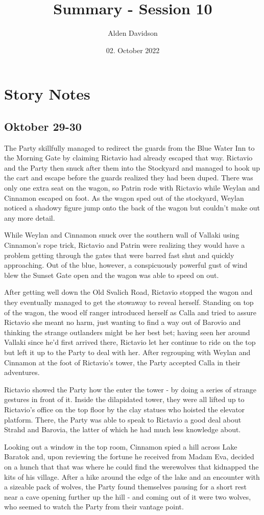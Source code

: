 \documentclass[a4paper,11pt]{article}
\title{Summary - Session 10}
\author{Alden Davidson}
\date{02. October 2022}
\begin{document}
\maketitle

\section{Story Notes}
\subsection{Oktober 29-30}
The Party skillfully managed to redirect the guards from the Blue Water Inn to the Morning Gate by claiming Rictavio
had already escaped that way. Rictavio and the Party then snuck after them into the Stockyard and managed to hook up
the cart and escape before the guards realized they had been duped. There was only one extra seat on the wagon, so
Patrin rode with Rictavio while Weylan and Cinnamon escaped on foot. As the wagon sped out of the stockyard, Weylan 
noticed a shadowy figure jump onto the back of the wagon but couldn't make out any more detail.

While Weylan and Cinnamon snuck over the southern wall of Vallaki using Cinnamon's rope trick, Rictavio and Patrin
were realizing they would have a problem getting through the gates that were barred fast shut and quickly 
approaching. Out of the blue, however, a conspicuously powerful gust of wind blew the Sunset Gate open and the wagon
was able to speed on out.

After getting well down the Old Svalich Road, Rictavio stopped the wagon and they eventually managed to get the
stowaway to reveal herself. Standing on top of the wagon, the wood elf ranger introduced herself as Calla and tried
to assure Rictavio she meant no harm, just wanting to find a way out of Barovio and thinking the strange outlanders 
might be her best bet; having seen her around Vallaki since he'd first arrived there, Rictavio let her continue to 
ride on the top but left it up to the Party to deal with her. After regrouping with Weylan and Cinnamon at the foot 
of Rictavio's tower, the Party accepted Calla in their adventures.

Rictavio showed the Party how the enter the tower - by doing a series of strange gestures in front of it. Inside
the dilapidated tower, they were all lifted up to Rictavio's office on the top floor by the clay statues who hoisted 
the elevator platform. There, the Party was able to speak to Rictavio a good deal about Strahd and Barovia, the 
latter of which he had much less knowledge about.

Looking out a window in the top room, Cinnamon spied a hill across Lake Baratok and, upon reviewing the fortune he
received from Madam Eva, decided on a hunch that that was where he could find the werewolves that kidnapped the kits 
of his village. After a hike around the edge of the lake and an encounter with a sizeable pack of wolves, the Party
found themselves pausing for a short rest near a cave opening further up the hill - and coming out of it were two 
wolves, who seemed to watch the Party from their vantage point.
\end{document}
